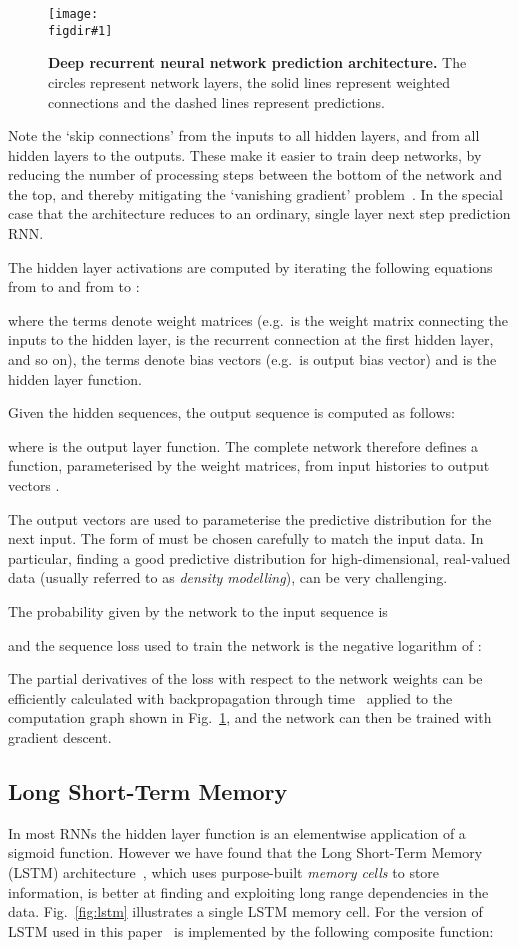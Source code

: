 \documentclass{article}
\newcommand{\eg}{e.g.\ }
\newcommand{\flabel}[1]{\label{fig:#1}}
\newcommand{\seclabel}[1]{\label{sec:#1}}
\newcommand{\fref}[1]{Fig.~\ref{fig:#1}}
\newcommand{\figdir}{}
\newcommand{\capt}[2]{\caption[#1]{\textbf{#1}#2}}
\newcommand{\fig}[5]
{
\begin{figure}
\begin{center}
\texttt{[image: \\figdir\#1]}
\end{center}
\capt{#4}{#5}
\flabel{#2}
\end{figure}
}
\begin{document}
\fig{deep_predictor}{deep_predictor}{0.925}{Deep recurrent neural network prediction architecture.}{ The circles represent network layers, the solid lines represent weighted connections and the dashed lines represent predictions.}

Note the `skip connections' from the inputs to all hidden layers, and from all hidden layers to the outputs.
These make it easier to train deep networks, by reducing the number of processing steps between the bottom of the network and the top, and thereby mitigating the `vanishing gradient' problem~\cite{bengio94learning}.
In the special case that  the architecture reduces to an ordinary, single layer next step prediction RNN.

The hidden layer activations are computed by iterating the following equations from  to  and from  to :
 
where the  terms denote weight matrices (\eg  is the weight matrix connecting the inputs to the  hidden layer,  is the recurrent connection at the first hidden layer, and so on), the  terms denote bias vectors (\eg  is output bias vector) and  is the hidden layer function. 

Given the hidden sequences, the output sequence is computed as follows:

where  is the output layer function.
The complete network therefore defines a function, parameterised by the weight matrices, from input histories  to output vectors .

The output vectors  are used to parameterise the predictive distribution  for the next input.
The form of  must be chosen carefully to match the input data.
In particular, finding a good predictive distribution for high-dimensional, real-valued data (usually referred to as \emph{density modelling}), can be very challenging.





The probability given by the network to the input sequence  is

and the sequence loss  used to train the network is the negative logarithm of :

The partial derivatives of the loss with respect to the network weights can be efficiently calculated with backpropagation through time~\cite{williams95bptt} applied to the computation graph shown in \fref{deep_predictor}, and 
the network can then be trained with gradient descent.

\subsection{Long Short-Term Memory}
\seclabel{lstm}
In most RNNs the hidden layer function  is an elementwise application of a sigmoid function.
However we have found that the Long Short-Term Memory (LSTM) architecture~\cite{hochreiter97lstm}, which uses purpose-built \emph{memory cells} to store information, is better at finding and exploiting long range dependencies in the data.
\fref{lstm} illustrates a single LSTM memory cell.
For the version of LSTM used in this paper~\cite{gers02peepholes}  is implemented by the following composite function:
\end{document}
